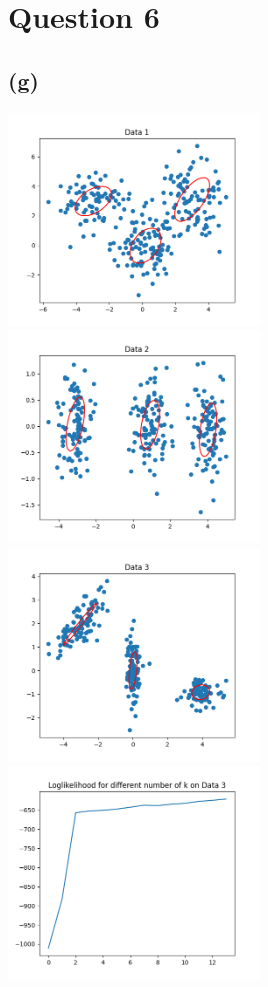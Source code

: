 \section*{Question 6}
\subsection*{(g)}
\graphicspath{{q6_expectation_maximization_python/}}
\includegraphics[width=0.5\textwidth]{Figure_1.png}
\includegraphics[width=0.5\textwidth]{Figure_2.png}
\includegraphics[width=0.5\textwidth]{Figure_3.png}
\includegraphics[width=0.5\textwidth]{Figure_4.png}

